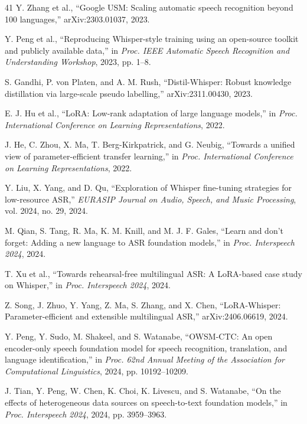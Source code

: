 \documentclass[11pt]{article}
\begin{document}
\begin{thebibliography}{41}
Y. Zhang et al., ``Google USM: Scaling automatic speech recognition beyond 100 languages,'' arXiv:2303.01037, 2023.

Y. Peng et al., ``Reproducing Whisper-style training using an open-source toolkit and publicly available data,'' in \textit{Proc. IEEE Automatic Speech Recognition and Understanding Workshop}, 2023, pp. 1--8.

S. Gandhi, P. von Platen, and A. M. Rush, ``Distil-Whisper: Robust knowledge distillation via large-scale pseudo labelling,'' arXiv:2311.00430, 2023.

E. J. Hu et al., ``LoRA: Low-rank adaptation of large language models,'' in \textit{Proc. International Conference on Learning Representations}, 2022.

J. He, C. Zhou, X. Ma, T. Berg-Kirkpatrick, and G. Neubig, ``Towards a unified view of parameter-efficient transfer learning,'' in \textit{Proc. International Conference on Learning Representations}, 2022.

Y. Liu, X. Yang, and D. Qu, ``Exploration of Whisper fine-tuning strategies for low-resource ASR,'' \textit{EURASIP Journal on Audio, Speech, and Music Processing}, vol. 2024, no. 29, 2024.

M. Qian, S. Tang, R. Ma, K. M. Knill, and M. J. F. Gales, ``Learn and don't forget: Adding a new language to ASR foundation models,'' in \textit{Proc. Interspeech 2024}, 2024.

T. Xu et al., ``Towards rehearsal-free multilingual ASR: A LoRA-based case study on Whisper,'' in \textit{Proc. Interspeech 2024}, 2024.

Z. Song, J. Zhuo, Y. Yang, Z. Ma, S. Zhang, and X. Chen, ``LoRA-Whisper: Parameter-efficient and extensible multilingual ASR,'' arXiv:2406.06619, 2024.

Y. Peng, Y. Sudo, M. Shakeel, and S. Watanabe, ``OWSM-CTC: An open encoder-only speech foundation model for speech recognition, translation, and language identification,'' in \textit{Proc. 62nd Annual Meeting of the Association for Computational Linguistics}, 2024, pp. 10192--10209.

J. Tian, Y. Peng, W. Chen, K. Choi, K. Livescu, and S. Watanabe, ``On the effects of heterogeneous data sources on speech-to-text foundation models,'' in \textit{Proc. Interspeech 2024}, 2024, pp. 3959--3963.


\end{thebibliography}
\end{document}
